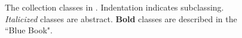 \documentclass[a4paper,10pt,twoside]{book}
\begin{document}
\begin{figure}
\begin{center}
\ifluluelse
	{}
	{}
\caption{The collection classes in \squeak. Indentation indicates subclassing.
\textit{\textsf{Italicized}} classes are abstract.
{\textbf{Bold}} classes are described in the ``Blue Book".}
\label{fig:CollClassesList}
\end{center}
\end{figure}
\end{document}
